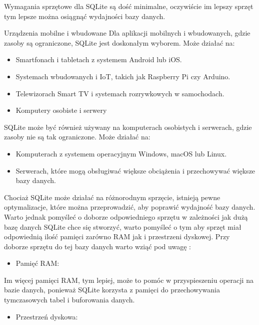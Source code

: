 \documentclass[letterpaper,10pt,polish]{sphinxmanual}
\begin{document}
\sphinxAtStartPar
Wymagania sprzętowe dla SQLite są dość minimalne, oczywiście im lepszy sprzęt tym lepsze można osiągnąć wydajności bazy danych.

\sphinxAtStartPar
Urządzenia mobilne i wbudowane
Dla aplikacji mobilnych i wbudowanych, gdzie zasoby są ograniczone, SQLite jest doskonałym wyborem. Może działać na:
\begin{itemize}
\item {} 
\sphinxAtStartPar
Smartfonach i tabletach z systemem Android lub iOS.

\item {} 
\sphinxAtStartPar
Systemach wbudowanych i IoT, takich jak Raspberry Pi czy Arduino.

\item {} 
\sphinxAtStartPar
Telewizorach Smart TV i systemach rozrywkowych w samochodach.

\item {} 
\sphinxAtStartPar
Komputery osobiste i serwery

\end{itemize}

\sphinxAtStartPar
SQLite może być również używany na komputerach osobistych i serwerach, gdzie zasoby nie są tak ograniczone. Może działać na:
\begin{itemize}
\item {} 
\sphinxAtStartPar
Komputerach z systemem operacyjnym Windows, macOS lub Linux.

\item {} 
\sphinxAtStartPar
Serwerach, które mogą obsługiwać większe obciążenia i przechowywać większe bazy danych.

\end{itemize}

\sphinxAtStartPar
Chociaż SQLite może działać na różnorodnym sprzęcie, istnieją pewne optymalizacje, które można przeprowadzić, aby poprawić wydajność bazy danych. Warto jednak pomyśleć o doborze odpowiedniego sprzętu w zależności jak dużą bazę danych SQLite chce się stworzyć, warto pomyśleć o tym aby sprzęt miał odpowiednią ilość pamięci zarówno RAM jak i  przestrzeni dyskowej. Przy doborze sprzętu do tej bazy danych warto wziąć pod uwagę :
\begin{itemize}
\item {} 
\sphinxAtStartPar
Pamięć RAM:

\end{itemize}

\sphinxAtStartPar
Im więcej pamięci RAM, tym lepiej, może to pomóc w przyspieszeniu operacji na bazie danych, ponieważ SQLite korzysta z pamięci do przechowywania tymczasowych tabel i buforowania danych.
\begin{itemize}
\item {} 
\sphinxAtStartPar
Przestrzeń dyskowa:

\end{itemize}
\end{document}
